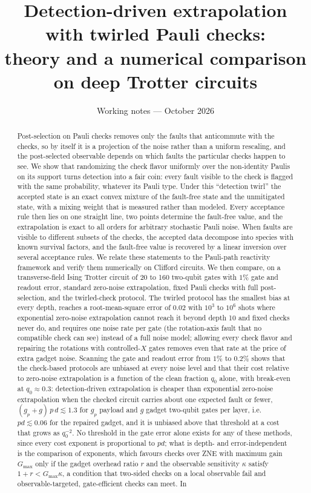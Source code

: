 \documentclass[11pt,a4paper]{article}
\title{Detection-driven extrapolation with twirled Pauli checks:\\ theory and a numerical comparison on deep Trotter circuits}
\author{Working notes --- October 2026}
\date{}
\theoremstyle{remark}
\begin{document}
\maketitle

\begin{abstract}
Post-selection on Pauli checks removes only the faults that anticommute with the checks, so by itself it is a projection of the noise rather than a uniform rescaling, and the post-selected observable depends on which faults the particular checks happen to see. We show that randomizing the check flavor uniformly over the non-identity Paulis on its support turns detection into a fair coin: every fault visible to the check is flagged with the same probability, whatever its Pauli type. Under this ``detection twirl'' the accepted state is an exact convex mixture of the fault-free state and the unmitigated state, with a mixing weight that is measured rather than modeled. Every acceptance rule then lies on one straight line, two points determine the fault-free value, and the extrapolation is exact to all orders for arbitrary stochastic Pauli noise. When faults are visible to different subsets of the checks, the accepted data decompose into species with known survival factors, and the fault-free value is recovered by a linear inversion over several acceptance rules. We relate these statements to the Pauli-path reactivity framework and verify them numerically on Clifford circuits. We then compare, on a transverse-field Ising Trotter circuit of 20 to 160 two-qubit gates with $1\%$ gate and readout error, standard zero-noise extrapolation, fixed Pauli checks with full post-selection, and the twirled-check protocol. The twirled protocol has the smallest bias at every depth, reaches a root-mean-square error of $0.02$ with $10^{3}$ to $10^{6}$ shots where exponential zero-noise extrapolation cannot reach it beyond depth 10 and fixed checks never do, and requires one noise rate per gate (the rotation-axis fault that no compatible check can see) instead of a full noise model; allowing every check flavor and repairing the rotations with controlled-$X$ gates removes even that rate at the price of extra gadget noise. Scanning the gate and readout error from $1\%$ to $0.2\%$ shows that the check-based protocols are unbiased at every noise level and that their cost relative to zero-noise extrapolation is a function of the clean fraction $q_0$ alone, with break-even at $q_0\approx0.3$: detection-driven extrapolation is cheaper than exponential zero-noise extrapolation when the checked circuit carries about one expected fault or fewer, $(g_p+g)\,p\,d\lesssim1.3$ for $g_p$ payload and $g$ gadget two-qubit gates per layer, i.e.\ $pd\lesssim0.06$ for the repaired gadget, and it is unbiased above that threshold at a cost that grows as $q_0^{-2}$. No threshold in the gate error alone exists for any of these methods, since every cost exponent is proportional to $pd$; what is depth- and error-independent is the comparison of exponents, which favours checks over ZNE with maximum gain $G_{\max}$ only if the gadget overhead ratio $r$ and the observable sensitivity $\kappa$ satisfy $1+r<G_{\max}\kappa$, a condition that two-sided checks on a local observable fail and observable-targeted, gate-efficient checks can meet. In 
\end{abstract}
\end{document}
